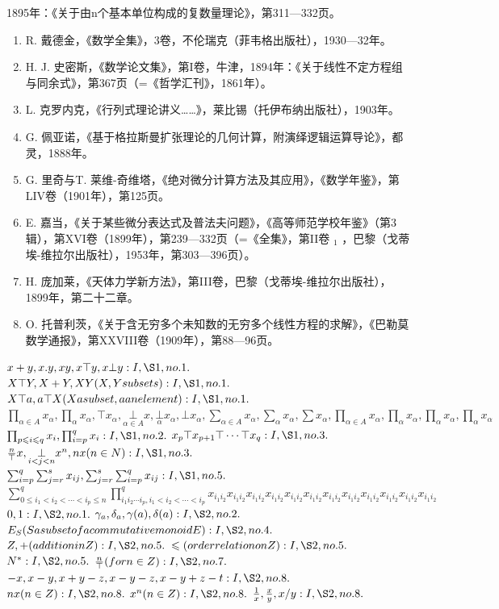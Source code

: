 1895年：《关于由n个基本单位构成的复数量理论》，第311—332页。

\begin{enumerate}
\def\labelenumi{\arabic{enumi}.}
\setcounter{enumi}{23}
\item
  R. 戴德金，《数学全集》，3卷，不伦瑞克（菲韦格出版社），1930—32年。
\item
  H. J. 史密斯，《数学论文集》，第I卷，牛津，1894年：《关于线性不定方程组与同余式》，第367页（=《哲学汇刊》，1861年）。
\item
  L. 克罗内克，《行列式理论讲义……》，莱比锡（托伊布纳出版社），1903年。
\item
  G. 佩亚诺，《基于格拉斯曼扩张理论的几何计算，附演绎逻辑运算导论》，都灵，1888年。
\item
  G. 里奇与T. 莱维-奇维塔，《绝对微分计算方法及其应用》，《数学年鉴》，第LIV卷（1901年），第125页。
\item
  E. 嘉当，《关于某些微分表达式及普法夫问题》，《高等师范学校年鉴》（第3辑），第XVI卷（1899年），第239—332页（=《全集》，第II卷 \(_{1}\) ，巴黎（戈蒂埃-维拉尔出版社），1953年，第303—396页）。
\item
  H. 庞加莱，《天体力学新方法》，第III卷，巴黎（戈蒂埃-维拉尔出版社），1899年，第二十二章。
\item
  O. 托普利茨，《关于含无穷多个未知数的无穷多个线性方程的求解》，《巴勒莫数学通报》，第XXVIII卷（1909年），第88—96页。
\end{enumerate}


\(x + y, x.y, xy, x \top y, x \bot y: I, \S 1, no. 1.\) \(X \top Y, X + Y, XY (X, Y subsets): I, \S 1, no. 1.\) \(X \top a, a \top X (X a subset, a an element): I, \S 1, no. 1.\) \(\prod_{\alpha \in A} x_{\alpha}, \prod_{\alpha} x_{\alpha}, \top x_{\alpha}, \underset{\alpha \in A}{\bot} x, \underset{\alpha}{\bot} x_{\alpha}, \bot x_{\alpha}, \sum_{\alpha \in A} x_{\alpha}, \sum_{\alpha} x_{\alpha}, \sum x_{\alpha}, \prod_{\alpha \in A} x_{\alpha}, \prod_{\alpha} x_{\alpha}, \prod_{\alpha} x_{\alpha}, \prod_{\alpha} x_{\alpha}\) \(\prod_{p \leqslant i \leqslant q} x_i, \prod_{i=p}^q x_i: I, \S 1, no. 2.\) \(x_p \top x_{p+1} \top \cdots \top x_q: I, \S 1, no. 3.\) \(\frac{n}{\top} x, \underset{i < j < n}{\bot} x^n, nx (n \in N): I, \S 1, no. 3.\) \(\sum_{i=p}^{q} \sum_{j=r}^{s} x_{ij}, \sum_{j=r}^{s} \sum_{i=p}^{q} x_{ij}: I, \S 1, no. 5.\) \(\sum_{0 \leqslant i_1 < i_2 < \cdots < i_p \leqslant n} ^{q} \prod_{i_1 i_2 \cdots i_p, i_1 < i_2 < \cdots < i_p} ^{q} x_{i_1 i_2} x_{i_1 i_2} x_{i_1 i_2} x_{i_1 i_2} x_{i_1 i_2} x_{i_1 i_2} x_{i_1 i_2} x_{i_1 i_2} x_{i_1 i_2} x_{i_1 i_2} x_{i_1 i_2} x_{i_1 i_2}\) \(0, 1: I, \S 2, no. 1.\) \(\gamma_a, \delta_a, \gamma(a), \delta(a): I, \S 2, no. 2.\) \(E_S (S a subset of a commutative monoid E): I, \S 2, no. 4.\) \(Z, +(addition in Z): I, \S 2, no. 5.\) \(\leqslant (order relation on Z): I, \S 2, no. 5.\) \(N^*: I, \S 2, no. 5.\) \(\frac{n}{\top} (for n \in Z): I, \S 2, no. 7.\) \(-x, x - y, x + y - z, x - y - z, x - y + z - t: I, \S 2, no. 8.\) \(nx (n \in Z): I, \S 2, no. 8.\) \(x^n (n \in Z): I, \S 2, no. 8.\) \(\frac{1}{x}, \frac{x}{y}, x/y: I, \S 2, no. 8.\)

